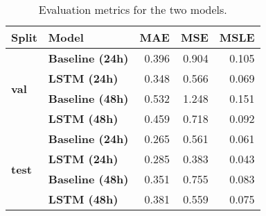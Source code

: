 \begin{table}[h]
\centering
\caption{Evaluation metrics for the two models.}
\begin{tabular}{llrrr}
\toprule
\textbf{Split} & \textbf{Model} &   \textbf{MAE} &   \textbf{MSE} &  \textbf{MSLE} \\
\midrule
\multirow{4}{*}{\textbf{val}} & \textbf{Baseline (24h)} & 0.396 & 0.904 & 0.105 \\
    & \textbf{LSTM (24h)} & 0.348 & 0.566 & 0.069 \\
    & \textbf{Baseline (48h)} & 0.532 & 1.248 & 0.151 \\
    & \textbf{LSTM (48h)} & 0.459 & 0.718 & 0.092 \\
\cline{1-5}
\multirow{4}{*}{\textbf{test}} & \textbf{Baseline (24h)} & 0.265 & 0.561 & 0.061 \\
    & \textbf{LSTM (24h)} & 0.285 & 0.383 & 0.043 \\
    & \textbf{Baseline (48h)} & 0.351 & 0.755 & 0.083 \\
    & \textbf{LSTM (48h)} & 0.381 & 0.559 & 0.075 \\
\bottomrule
\end{tabular}
\label{tab:prediction_results}
\end{table}
